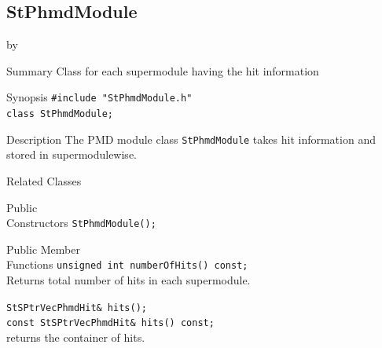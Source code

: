 \documentclass[twoside]{article}
\newcommand{\entrylabel}[1]{\mbox{\textbf{{#1}}}\hfil}%
\newenvironment{entry}
{\begin{list}{}%
    {\renewcommand{\makelabel}{\entrylabel}%
     \setlength{\labelwidth}{90pt}%
     \setlength{\leftmargin}{\labelwidth}
     \advance\leftmargin by \labelsep%
      }%
    }%
  {\end{list}}
\newcommand{\Entrylabel}[1]%
{\raisebox{0pt}[1ex][0pt]{\makebox[\labelwidth][l]%
    {\parbox[t]{\labelwidth}{\hspace{0pt}\textbf{{#1}}}}}}
\newenvironment{Entry}%
{\renewcommand{\entrylabel}{\Entrylabel}\begin{entry}}%
  {\end{entry}}
\begin{document}
\subsection{StPhmdModule}
\label{sec:StPhmdModule}
\begin{Entry}
\item[Summary] Class for each supermodule having the hit information\\
\item[Synopsis]
    \verb+#include "StPhmdModule.h"+\\
    \verb+class StPhmdModule;+\\

\item[Description] 
 The PMD module class \texttt{StPhmdModule} takes hit information
 and stored in supermodulewise.\\

\item[Related Classes]
\item[Public\\ Constructors]
    \verb+StPhmdModule();+\\
\item[Public Member\\ Functions]
    \verb+unsigned int numberOfHits() const;+\\
     Returns total number of hits in each supermodule.

    \verb+StSPtrVecPhmdHit& hits();+\\
    \verb+const StSPtrVecPhmdHit& hits() const;+\\
    returns the container of hits.

\end{Entry}
\clearpage
\end{document}
